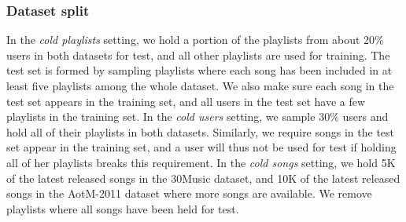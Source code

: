 \subsubsection{Dataset split}
In the \emph{cold playlists} setting,
we hold a portion of the playlists from about 20\% users in both datasets for test, 
and all other playlists are used for training.
The test set is formed by sampling playlists where each song has been included in 
at least five playlists among the whole dataset.
We also make sure each song in the test set appears in the training set,
and all users in the test set have a few %
playlists in the training set.
%
In the \emph{cold users} setting,
we sample 30\% users and hold all of their playlists in both datasets.
Similarly, we require songs in the test set appear in the training set,
and a user will thus not be used for test %
if holding all of her playlists breaks this requirement.
%
In the \emph{cold songs} setting,
we hold 5K of the latest released songs in the 30Music dataset,
and 10K of the latest released songs in the AotM-2011 dataset where more songs are available.
We remove playlists where all songs have been held for test. %


